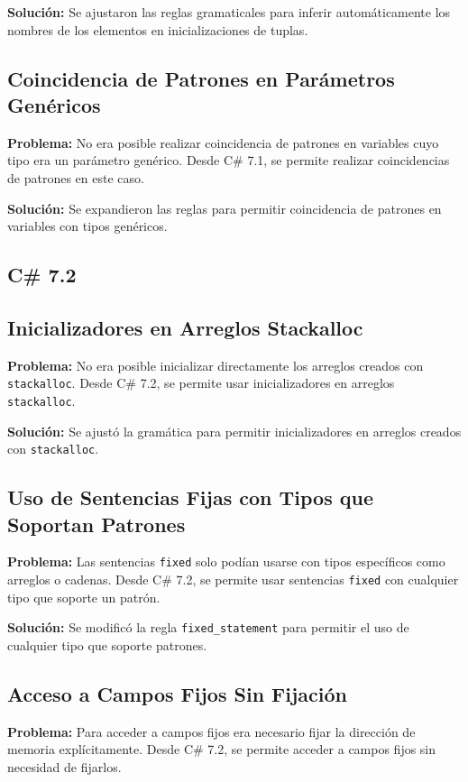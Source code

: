 \textbf{Solución:} Se ajustaron las reglas gramaticales para inferir automáticamente los nombres de los elementos en inicializaciones de tuplas.

\subsection*{Coincidencia de Patrones en Parámetros Genéricos}
\textbf{Problema:} No era posible realizar coincidencia de patrones en variables cuyo tipo era un parámetro genérico. Desde C\# 7.1, se permite realizar coincidencias de patrones en este caso.

\textbf{Solución:} Se expandieron las reglas para permitir coincidencia de patrones en variables con tipos genéricos.


\subsection{C\# 7.2}

\subsection*{Inicializadores en Arreglos Stackalloc}
\textbf{Problema:} No era posible inicializar directamente los arreglos creados con \texttt{stackalloc}. Desde C\# 7.2, se permite usar inicializadores en arreglos \texttt{stackalloc}.

\textbf{Solución:} Se ajustó la gramática para permitir inicializadores en arreglos creados con \texttt{stackalloc}.

\subsection*{Uso de Sentencias Fijas con Tipos que Soportan Patrones}
\textbf{Problema:} Las sentencias \texttt{fixed} solo podían usarse con tipos específicos como arreglos o cadenas. Desde C\# 7.2, se permite usar sentencias \texttt{fixed} con cualquier tipo que soporte un patrón.

\textbf{Solución:} Se modificó la regla \texttt{fixed\_statement} para permitir el uso de cualquier tipo que soporte patrones.

\subsection*{Acceso a Campos Fijos Sin Fijación}
\textbf{Problema:} Para acceder a campos fijos era necesario fijar la dirección de memoria explícitamente. Desde C\# 7.2, se permite acceder a campos fijos sin necesidad de fijarlos.

